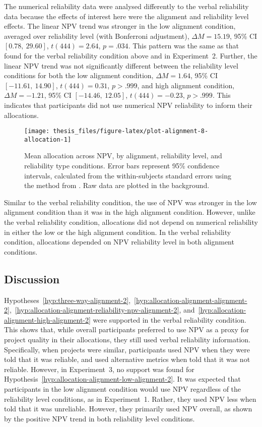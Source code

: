 \documentclass[a4paper, nobind]{templates/ociamthesis}
\theoremstyle{definition}
\theoremstyle{definition}
\theoremstyle{definition}
\theoremstyle{definition}
\theoremstyle{remark}
\begin{document}
The numerical reliability data were analysed differently to the verbal
reliability data because the effects of interest here were the alignment and
reliability level effects. The linear NPV trend was stronger in the low
alignment condition, averaged over reliability level (with Bonferroni
adjustment),
\(\Delta M = 15.19\), 95\% CI \([0.78,~29.60]\), \(t(444) = 2.64\), \(p = .034\). This
pattern was the same as that found for the verbal reliability condition above
and in Experiment~2. Further, the linear NPV trend was not significantly
different between the reliability level conditions for both the low alignment
condition,
\(\Delta M = 1.64\), 95\% CI \([-11.61,~14.90]\), \(t(444) = 0.31\), \(p > .999\),
and high alignment condition,
\(\Delta M = -1.21\), 95\% CI \([-14.46,~12.05]\), \(t(444) = -0.23\), \(p > .999\).
This indicates that participants did not use numerical NPV reliability to inform
their allocations.



\begin{figure}[!htbp]
\texttt{[image: thesis\_files/figure-latex/plot-alignment-8-allocation-1]} \caption{Mean allocation across NPV, by alignment, reliability level, and reliability type conditions. Error bars represent 95\% confidence intervals, calculated from the within-subjects standard errors using the method from \textcite{cousineau2014}. Raw data are plotted in the background.}\label{fig:plot-alignment-8-allocation}
\end{figure}

Similar to the verbal reliability condition, the use of NPV was stronger in the
low alignment condition than it was in the high alignment condition. However,
unlike the verbal reliability condition, allocations did not depend on numerical
reliability in either the low or the high alignment condition. In the verbal
reliability condition, allocations depended on NPV reliability level in both
alignment conditions.

\subsection{Discussion}

Hypotheses~\ref{hyp:three-way-alignment-2},~\ref{hyp:allocation-alignment-alignment-2},~\ref{hyp:allocation-alignment-reliability-npv-alignment-2},
and~\ref{hyp:allocation-alignment-high-alignment-2} were supported in the
verbal reliability condition. This shows that, while overall participants
preferred to use NPV as a proxy for project quality in their allocations, they
still used verbal reliability information. Specifically, when projects were
similar, participants used NPV when they were told that it was reliable, and
used alternative metrics when told that it was not reliable. However, in
Experiment~3, no support was found for
Hypothesis~\ref{hyp:allocation-alignment-low-alignment-2}. It was expected that
participants in the low alignment condition would use NPV regardless of the
reliability level conditions, as in Experiment~1. Rather, they used NPV less
when told that it was unreliable. However, they primarily used NPV overall, as
shown by the positive NPV trend in both reliability level conditions.
\end{document}
